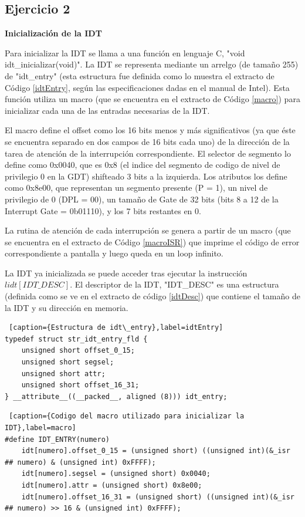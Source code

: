 \documentclass[a4paper]{article}
\begin{document}
\subsection{Ejercicio 2}

\textbf{Inicialización de la IDT}

\par Para inicializar la IDT se llama a una funci\'on en lenguaje C, "void idt\_inicializar(void)". La IDT se representa mediante un arrelgo (de tama\~no 255) de "idt\_entry"
(esta estructura fue definida como lo muestra el extracto de C\'odigo \ref{idtEntry}, seg\'un las especificaciones dadas en el manual de Intel). Esta funci\'on utiliza un macro
(que se encuentra en el extracto de C\'odigo \ref{macro}) para inicializar cada una de las entradas necesarias de la IDT. 
\par El macro define el offset como los 16 bits menos y m\'as significativos (ya que \'este se encuentra separado en dos campos de 16 bits cada uno) de la direcci\'on de la tarea de atenci\'on
de la interrupci\'on correspondiente. El selector de segmento lo define como 0x0040, que es 0x8 (el indice del segmento de codigo de nivel de privilegio 0 en la GDT) shifteado 3 bits a la izquierda.
Los atributos los define como 0x8e00, que representan un segmento presente (P = 1), un nivel de privilegio de 0 (DPL = 00), un tama\~no de Gate de 32 bits (bits 8 a 12 de la Interrupt Gate = 0b01110),
y los 7 bits restantes en 0. 
\par La rutina de atenci\'on de cada interrupci\'on se genera a partir de un macro (que se encuentra en el extracto de C\'odigo \ref{macroISR}) que imprime el c\'odigo de error correspondiente
a pantalla y luego queda en un loop infinito.
\par La IDT ya inicializada se puede acceder tras ejecutar la instrucci\'on $lidt [IDT\_DESC]$. El descriptor de la IDT, "IDT\_DESC" es una estructura (definida como se ve en el extracto de
c\'odigo \ref{idtDesc}) que contiene el tama\~no de la IDT y su direcci\'on en memoria.

\begin{lstlisting} [caption={Estructura de idt\_entry},label=idtEntry]
typedef struct str_idt_entry_fld {
    unsigned short offset_0_15;
    unsigned short segsel;
    unsigned short attr;
    unsigned short offset_16_31;
} __attribute__((__packed__, aligned (8))) idt_entry;

\end{lstlisting}


\begin{lstlisting} [caption={Codigo del macro utilizado para inicializar la IDT},label=macro]
#define IDT_ENTRY(numero)                                                                                        
    idt[numero].offset_0_15 = (unsigned short) ((unsigned int)(&_isr ## numero) & (unsigned int) 0xFFFF);        
    idt[numero].segsel = (unsigned short) 0x0040;                                                                
    idt[numero].attr = (unsigned short) 0x8e00;                                                                  
    idt[numero].offset_16_31 = (unsigned short) ((unsigned int)(&_isr ## numero) >> 16 & (unsigned int) 0xFFFF);
\end{lstlisting}
\end{document}
